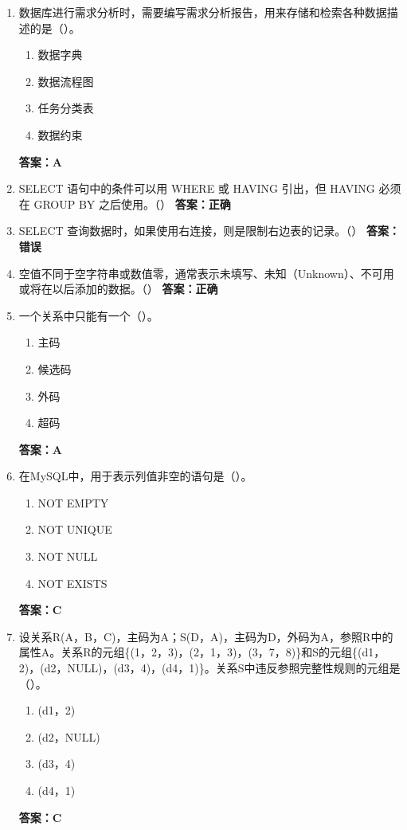 \documentclass[12pt, a4paper]{article}
\begin{document}
\begin{enumerate}[label=\arabic*.]
	\item 数据库进行需求分析时，需要编写需求分析报告，用来存储和检索各种数据描述的是（\quad）。
	      \begin{enumerate}
		      \item 数据字典
		      \item 数据流程图
		      \item 任务分类表
		      \item 数据约束
	      \end{enumerate}
	      \textbf{答案：A}

	\item SELECT 语句中的条件可以用 WHERE 或 HAVING 引出，但 HAVING 必须在 GROUP BY 之后使用。（\quad）
	      \textbf{答案：正确}

	\item SELECT 查询数据时，如果使用右连接，则是限制右边表的记录。（\quad）
	      \textbf{答案：错误}

	\item 空值不同于空字符串或数值零，通常表示未填写、未知（Unknown）、不可用或将在以后添加的数据。（\quad）
	      \textbf{答案：正确}

	\item 一个关系中只能有一个（\quad）。
	      \begin{enumerate}
		      \item 主码
		      \item 候选码
		      \item 外码
		      \item 超码
	      \end{enumerate}
	      \textbf{答案：A}

	\item 在MySQL中，用于表示列值非空的语句是（\quad）。
	      \begin{enumerate}
		      \item NOT EMPTY
		      \item NOT UNIQUE
		      \item NOT NULL
		      \item NOT EXISTS
	      \end{enumerate}
	      \textbf{答案：C}

	\item 设关系R(A，B，C)，主码为A；S(D，A)，主码为D，外码为A，参照R中的属性A。关系R的元组\{(1，2，3)，(2，1，3)，(3，7，8)\}和S的元组\{(d1，2)，(d2，NULL)，(d3，4)，(d4，1)\}。关系S中违反参照完整性规则的元组是（\quad）。
	      \begin{enumerate}
		      \item (d1，2)
		      \item (d2，NULL)
		      \item (d3，4)
		      \item (d4，1)
	      \end{enumerate}
	      \textbf{答案：C}


\end{enumerate}
\end{document}
